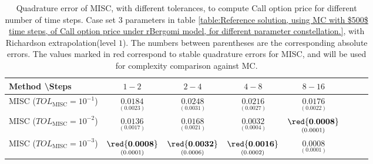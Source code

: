 \begin{table}[h!]
	\centering
	\begin{tabular}{l*{6}{c}r}
		Method \textbackslash  Steps            & $1-2$ & $2-4$ & $4-8$ & $8-16$  \\
		\hline
		MISC ($TOL_{\text{MISC}}=10^{-1}$) & $\underset{(0.0023)}{\mathbf{    0.0184
		}}$  & $\underset{( 0.0031)}{\mathbf{ 0.0248}}$   & $\underset{(   0.0027)}{\mathbf{  0.0216}}$ & $\underset{(  0.0022)}{\mathbf{  0.0176}}$  \\ 
		MISC ($TOL_{\text{MISC}}=10^{-2}$)   & $\underset{(    0.0017
			)}{\mathbf{  0.0136}}$  & $\underset{(
			0.0021)}{\mathbf{   0.0168}}$  & $\underset{(0.0004)}{\mathbf{   0.0032
		}}$  & $\underset{(0.0001)}{\mathbf{\red{0.0008}}}$  \\ 
		MISC ($TOL_{\text{MISC}}=10^{-3}$)  & $\underset{(0.0001)}{\mathbf{\red{0.0008}}}$  & $\underset{(0.0006)}{\mathbf{  \red{0.0032}}}$   & $\underset{(0.0002)}{\mathbf{    \red{0.0016}}}$  &  $\underset{(0.0001)}{\mathbf{0.0008}}$  \\ 
		
%		
		
		\hline
	\end{tabular}
	\caption{Quadrature error of MISC, with different tolerances, to compute Call option price  for different number of time steps. Case set $3$ parameters in table \ref{table:Reference solution, using MC with $500$ time steps, of Call option price under rBergomi model, for different parameter constellation.}, with Richardson extrapolation(level $1$). The numbers between parentheses are the corresponding absolute errors. The values marked in red correspond to stable quadrature errors for MISC, and will be used for complexity comparison against MC.}
	\label{Quadrature error of MISC to compute Call option price of the different tolerances for different number of time steps. Case set $3$ parameters, with Richardson extrapolation(level $1$). The numbers between parentheses are the corresponding absolute errors.}
\end{table}




